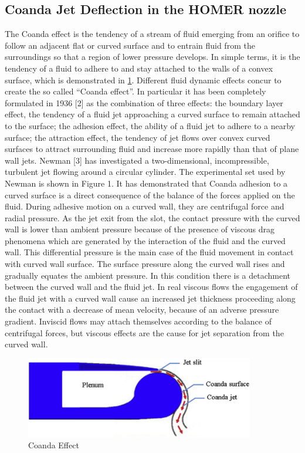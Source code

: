 \subsection{Coanda Jet Deflection in the HOMER nozzle}
The Coanda effect is the tendency of a stream of fluid emerging from an orifice to follow an adjacent flat or curved surface and to entrain fluid from the surroundings so that a region of lower pressure develops. In simple terms, it is the tendency of a fluid to adhere to and stay attached to the walls of a convex surface, which is demonstrated in \ref{fig:Coanda}. Different fluid dynamic effects concur to create the so called “Coanda effect”. In particular it has been completely formulated in 1936 [2] as the combination of three effects: the boundary layer effect, the tendency of a fluid jet approaching a curved surface to remain attached to the surface; the adhesion effect, the ability of a fluid jet to adhere to a nearby surface; the attraction effect, the tendency of jet flows over convex curved surfaces to attract surrounding fluid and increase more rapidly than that of plane wall jets. Newman [3] has investigated a two-dimensional, incompressible, turbulent jet flowing around a circular cylinder. The experimental set used by Newman is shown in Figure 1. It has demonstrated that Coanda adhesion to a curved surface is a direct consequence of the balance of the forces applied on the fluid. During adhesive motion on a curved wall, they are centrifugal force and radial pressure. As the jet exit from the slot, the contact pressure with the curved wall is lower than ambient pressure because of the presence of viscous drag phenomena which are generated by the interaction of the fluid and the curved wall. This differential pressure is the main case of the fluid movement in contact with curved wall surface. The surface pressure along the curved wall rises and gradually equates the ambient pressure. In this condition there is a detachment between the curved wall and the fluid jet. In real viscous flows the engagement of the fluid jet with a curved wall cause an increased jet thickness proceeding along the contact with a decrease of mean velocity, because of an adverse pressure gradient. Inviscid flows may attach themselves according to the balance of centrifugal forces, but viscous effects are the cause for jet separation from the curved wall.
\begin{figure}[ht]
    \centering
    \includegraphics[width=10cm]{images/Theory-CFD/Coanda-effect.png}
    \caption{Coanda Effect}
    \label{fig:Coanda}
  \end{figure}
